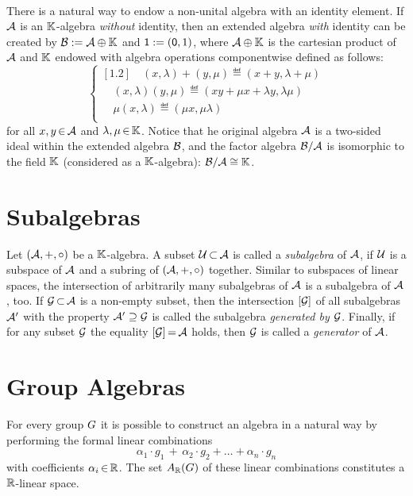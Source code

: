 \documentclass[11pt,twoside]{article}
\begin{document}
\paragraph{}
There is a natural way to endow a non-unital algebra with an identity element.
If ${\mathcal{A}}$ is an ${\mathbb{K}}$-algebra \textit{without} identity,
then an extended algebra \textit{with} identity can be created by
${\mathcal{B}} := {\mathcal{A}} \oplus {\mathbb{K}}$ and ${\mathsf{1}} := ({\mathsf{0}},1)$,
where ${\mathcal{A}} \oplus {\mathbb{K}}$ is the cartesian product of ${\mathcal{A}}$ and ${\mathbb{K}}$
endowed with algebra operations componentwise defined as follows:
\[
\begin{cases}[1.2]
\quad (x,\lambda) + (y,\mu) \eqdef (x+y, \lambda + \mu)\\
\quad (x,\lambda) (y,\mu)   \eqdef (xy + \mu x + \lambda y, \lambda \mu) \\
\quad \mu (x,\lambda)       \eqdef (\mu x, \mu \lambda)\\
\end{cases}
\]
for all $x,y {\,\in\,} {\mathcal{A}}$ and $\lambda,\mu {\,\in\,} {\mathbb{K}}$.
Notice
that he original algebra ${\mathcal{A}}$ is a two-sided ideal within
the extended algebra ${\mathcal{B}}$,
and the factor algebra ${\mathcal{B}}/{\mathcal{A}}$ is isomorphic to the field ${\mathbb{K}}$
(considered as a ${\mathbb{K}}$-algebra): ${\mathcal{B}}/{\mathcal{A}} \cong {\mathbb{K}}$.

\section{Subalgebras}
Let $({\mathcal{A}},+,\circ)$ be a ${\mathbb{K}}$-algebra.
A subset ${\mathcal{U}} {\,\subset\,} {\mathcal{A}}$ is called a \textit{subalgebra} of ${\mathcal{A}}$,
if ${\mathcal{U}}$ is a subspace of ${\mathcal{A}}$ and a subring of $({\mathcal{A}},+,\circ)$ together.
Similar to subspaces of linear spaces,
the intersection of arbitrarily many subalgebras of ${\mathcal{A}}$ is a subalgebra
of ${\mathcal{A}}$, too.
If ${\mathcal{G}} {\,\subset\,} {\mathcal{A}}$ is a non-empty subset,
then the intersection $[{\mathcal{G}}]$ of all subalgebras ${\mathcal{A}}'$ with the property
${\mathcal{A}}' \supseteq {\mathcal{G}}$ is called the subalgebra \textit{generated by ${\mathcal{G}}$}.
Finally,
if for any subset ${\mathcal{G}}$ the equality $[{\mathcal{G}}] {\,=\,} {\mathcal{A}}$ holds,
then ${\mathcal{G}}$ is called a \textit{generator} of ${\mathcal{A}}$.

\section{Group Algebras}
For every group $G$ it is possible to construct
an algebra in a natural way
by performing the formal linear combinations
\[
\alpha_1 \cdot g_1 \, + \, \alpha_2 \cdot g_2 + \ldots + \alpha_n \cdot g_n
\]
with coefficients $\alpha_i {\,\in\,} {\mathbb{R}}$.
The set $A_{{\mathbb{R}}}(G)$ of these linear combinations constitutes
a ${\mathbb{R}}$-linear space.
\end{document}
